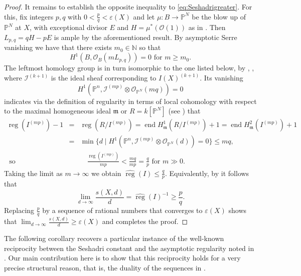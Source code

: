 \documentclass[12pt, reqno]{amsart}
\numberwithin{equation}{section}
\def\e{\ensuremath{\varepsilon}}
\newcommand{\fm}{{\mathfrak m}}
\newcommand{\N}{{\mathbb N}}
\renewcommand{\P}{{\mathbb P}}
\newcommand{\I}{{\mathcal I}}
\DeclareMathOperator{\reg}{reg}
\DeclareMathOperator{\soc}{end}
\theoremstyle{plain} %
\theoremstyle{definition}
\theoremstyle{remark}
\begin{document}
\begin{proof}
It remains to establish the opposite inequality to \eqref{eq:Seshadrigreater}. For this, fix integers $p, q$ with $0<\frac{p}{q}<\e(X)$ and let $\mu:B\to \P^N$ be the blow up of $\P^N$ at $X$, with exceptional divisor $E$ and $H=\mu^*(\mathcal{O}(1))$ as in . Then $L_{p,q}=qH- pE$ is ample by the aforementioned result. By asymptotic Serre vanishing \cite[Chapter III, Proposition 5.3]{Hartshorne} we have that there exists $m_0\in\N$ so that 
\[
H^1(B, \mathcal{O}_B(mL_{p,q})) = 0 \text{ for } m\geq m_0.
\]
The leftmost homology group is in turn isomorphic to the one listed below,  by \cite[Lemma 4.3.16]{Laz04}, , where $\I^{(k+1)}$ is the ideal sheaf corresponding to $I(X)^{(k+1)}$. 
Its va\-ni\-shing
\[
H^1(\P^n,  \I^{(mp)}\otimes \mathcal{O}_{\P^N}(mq))=0
\]
indicates via the definition of regularity in terms of local cohomology with respect to the maximal homogeneous ideal $\fm$ or $R=k[\P^N]$ (see ) that 
\begin{eqnarray*}
\reg(I^{(mp)})-1 &=& \reg(R/I^{(mp)})=\soc H^1_\fm(R/I^{(mp)})+1= \soc H^2_\fm(I^{(mp)})+1\\
           &=& \min\{d \mid H^1(\P^n,  \I^{(mp)}\otimes \mathcal{O}_{\P^N}(d))=0\} \leq mq,\\
\text{ so} & & \quad \frac{\reg(I^{(mp)})}{mp}<\frac{mq}{mp}=\frac{q}{p} \text{ for } m\gg0.
\end{eqnarray*}
Taking the limit as $m\to\infty$ we  obtain
$
\widehat{\reg}(I)\leq \frac{q}{p}
$. Equivalently, by  it follows that 
\[
 \lim_{d \to \infty} \frac{s(X,d)}{d} =\widehat{\reg}(I)^{-1}\geq \frac{p}{q}.
\]
Replacing $\frac{p}{q}$ by a sequence of rational numbers that converges to $\e(X)$ shows that $ \lim_{d \to \infty} \frac{s(X,d)}{d}\geq \e(X)$ and completes the proof.
\end{proof}


The following corollary recovers a particular instance of the well-known reciprocity between the Seshadri constant and the asymptotic regularity noted in \cite[Remark 1.3 and Theorem B]{CEL01}. Our main contribution here is to show that this reciprocity holds for a very precise structural reason, that is, the duality of the sequences in . 
\end{document}
